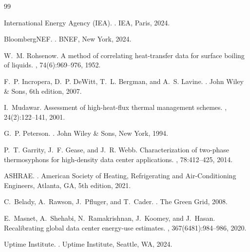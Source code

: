 
\begin{thebibliography}{99}

International Energy Agency (IEA).
.
\newblock IEA, Paris, 2024.

BloombergNEF.
.
\newblock BNEF, New York, 2024.

W.~M. Rohsenow.
\newblock A method of correlating heat-transfer data for surface boiling of liquids.
, 74(6):969--976, 1952.

F.~P. Incropera, D.~P. DeWitt, T.~L. Bergman, and A.~S. Lavine.
.
\newblock John Wiley \& Sons, 6th edition, 2007.

I.~Mudawar.
\newblock Assessment of high-heat-flux thermal management schemes.
, 24(2):122--141, 2001.

G.~P. Peterson.
.
\newblock John Wiley \& Sons, New York, 1994.

P.~T. Garrity, J.~F. Gease, and J.~R. Webb.
\newblock Characterization of two-phase thermosyphons for high-density data center applications.
, 78:412--425, 2014.

ASHRAE.
.
\newblock American Society of Heating, Refrigerating and Air-Conditioning Engineers, Atlanta, GA, 5th edition, 2021.

C.~Belady, A.~Rawson, J.~Pfluger, and T.~Cader.
.
\newblock The Green Grid, 2008.

E.~Masnet, A.~Shehabi, N.~Ramakrishnan, J.~Koomey, and J.~Hasan.
\newblock Recalibrating global data center energy-use estimates.
, 367(6481):984--986, 2020.

Uptime Institute.
.
\newblock Uptime Institute, Seattle, WA, 2024.


\end{thebibliography}
